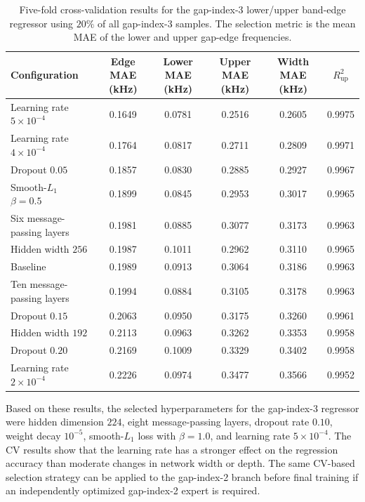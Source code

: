 \begin{table}[htbp]
    \centering
    \caption{Five-fold cross-validation results for the gap-index-3 lower/upper band-edge regressor using $20\%$ of all gap-index-3 samples. The selection metric is the mean MAE of the lower and upper gap-edge frequencies.}
    \label{tab:gap3_regressor_cv}
    \begin{tabular}{lccccc}
        \toprule
        Configuration & Edge MAE (kHz) & Lower MAE (kHz) & Upper MAE (kHz) & Width MAE (kHz) & $R^2_{\mathrm{up}}$ \\
        \midrule
        Learning rate $5\times10^{-4}$ & 0.1649 & 0.0781 & 0.2516 & 0.2605 & 0.9975 \\
        Learning rate $4\times10^{-4}$ & 0.1764 & 0.0817 & 0.2711 & 0.2809 & 0.9971 \\
        Dropout $0.05$                 & 0.1857 & 0.0830 & 0.2885 & 0.2927 & 0.9967 \\
        Smooth-$L_1$ $\beta=0.5$       & 0.1899 & 0.0845 & 0.2953 & 0.3017 & 0.9965 \\
        Six message-passing layers     & 0.1981 & 0.0885 & 0.3077 & 0.3173 & 0.9963 \\
        Hidden width $256$             & 0.1987 & 0.1011 & 0.2962 & 0.3110 & 0.9965 \\
        Baseline                       & 0.1989 & 0.0913 & 0.3064 & 0.3186 & 0.9963 \\
        Ten message-passing layers     & 0.1994 & 0.0884 & 0.3105 & 0.3178 & 0.9963 \\
        Dropout $0.15$                 & 0.2063 & 0.0950 & 0.3175 & 0.3260 & 0.9961 \\
        Hidden width $192$             & 0.2113 & 0.0963 & 0.3262 & 0.3353 & 0.9958 \\
        Dropout $0.20$                 & 0.2169 & 0.1009 & 0.3329 & 0.3402 & 0.9958 \\
        Learning rate $2\times10^{-4}$ & 0.2226 & 0.0974 & 0.3477 & 0.3566 & 0.9952 \\
        \bottomrule
    \end{tabular}
\end{table}

Based on these results, the selected hyperparameters for the gap-index-3 regressor were hidden dimension $224$, eight message-passing layers, dropout rate $0.10$, weight decay $10^{-5}$, smooth-$L_1$ loss with $\beta=1.0$, and learning rate $5\times10^{-4}$. The CV results show that the learning rate has a stronger effect on the regression accuracy than moderate changes in network width or depth. The same CV-based selection strategy can be applied to the gap-index-2 branch before final training if an independently optimized gap-index-2 expert is required.
